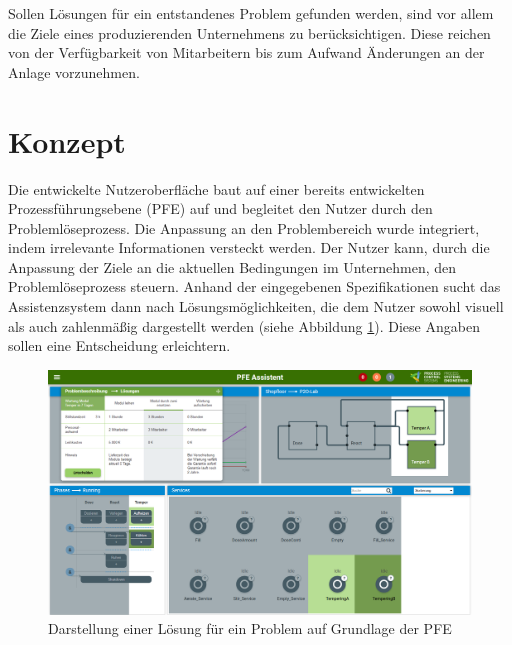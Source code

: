 \documentclass{ifaPoster}
\begin{document}
Sollen Lösungen für ein entstandenes Problem gefunden werden, sind vor allem die Ziele eines produzierenden Unternehmens zu berücksichtigen. Diese reichen von der Verfügbarkeit von Mitarbeitern bis zum Aufwand Änderungen an der Anlage vorzunehmen.

\section{Konzept}
Die entwickelte Nutzeroberfläche baut auf einer bereits entwickelten Prozessführungsebene (PFE) auf und begleitet den Nutzer durch den Problemlöseprozess. Die Anpassung an den Problembereich wurde integriert, indem irrelevante Informationen versteckt werden. Der Nutzer kann, durch die Anpassung der Ziele an die aktuellen Bedingungen im Unternehmen, den Problemlöseprozess steuern. Anhand der eingegebenen Spezifikationen sucht das Assistenzsystem dann nach Lösungsmöglichkeiten, die dem Nutzer sowohl visuell als auch zahlenmäßig dargestellt werden (siehe Abbildung \ref{PFE-Loesungen}). Diese Angaben sollen eine Entscheidung erleichtern.
\begin{figure}[htbp]
\centering
\includegraphics[scale=0.4]{DA_files/Prototyp-PFE-Loesung2.png}
\caption{Darstellung einer Lösung für ein Problem auf Grundlage der PFE}
\label{PFE-Loesungen}
\end{figure}
\end{document}
